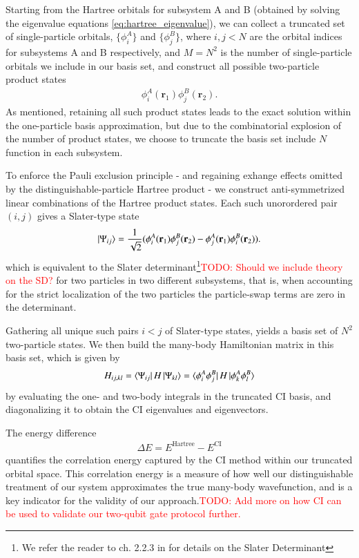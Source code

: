 \documentclass{subfiles}
\begin{document}
Starting from the Hartree orbitals for subsystem A and B (obtained by solving the eigenvalue equations \ref{eq:hartree_eigenvalue}), we can collect a truncated set of single-particle orbitals, $\{\phi^A_i\}$ and $\{\phi^B_j\}$, where $i,j<N$ are the orbital indices for subsystems A and B respectively, and $M=N^2$ is the number of single-particle orbitals we include in our basis set, and construct all possible two-particle product states
\begin{align*}
    \phi_i^A(\mathbf{r}_1)\phi_j^B(\mathbf{r}_2).
\end{align*}  
As mentioned, retaining all such product states leads to the exact solution within the one-particle basis approximation, but due to the combinatorial explosion of the number of product states, we choose to truncate the basis set include $N$ function in each subsystem. 

To enforce the Pauli exclusion principle - and regaining exhange effects omitted by the distinguishable-particle Hartree product - we construct anti-symmetrized linear combinations of the Hartree product states. Each such unorordered pair $(i,j)$ gives a Slater-type state
\begin{align*}
    \ket{\Psi_{ij}} = \frac{1}{\sqrt{2}}(\phi_i^A(\mathbf{r}_1)\phi_j^B(\mathbf{r}_2) - \phi_j^A(\mathbf{r}_1)\phi_i^B(\mathbf{r}_2)).
\end{align*}
which is equivalent to the Slater determinant\footnote{We refer the reader to ch. 2.2.3 in \cite{szabo1996modern} for details on the Slater Determinant}\textcolor{red}{TODO: Should we include theory on the SD?} for two particles in two different subsystems, that is, when accounting for the strict localization of the two particles the particle-swap terms are zero in the determinant. 

Gathering all unique such pairs $i<j$ of Slater-type states, yields a basis set of $N^2$ two-particle states. We then build the many-body Hamiltonian matrix in this basis set, which is given by
\begin{align*}
    H_{ij,kl} = \bra{\Psi_{ij}}H\ket{\Psi_{kl}} = \bra{\phi_i^A\phi_j^B}H\ket{\phi_k^A\phi_l^B}
\end{align*}
by evaluating the one- and two-body integrals in the truncated CI basis, and diagonalizing it to obtain the CI eigenvalues and eigenvectors. 

The energy difference
\begin{align*}
    \Delta E = E^{\text{Hartree}} - E^{\text{CI}}
\end{align*}
quantifies the correlation energy captured by the CI method within our truncated orbital space. This correlation energy is a measure of how well our distinguishable treatment of our system approximates the true many-body wavefunction, and is a key indicator for the validity of our approach.\textcolor{red}{TODO: Add more on how CI can be used to validate our two-qubit gate protocol further.}
\end{document}
